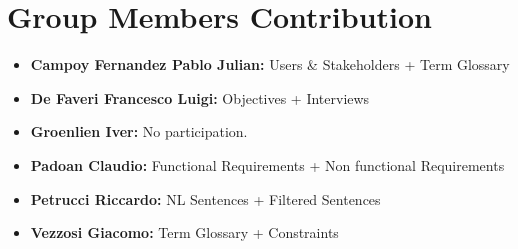 \documentclass{article}
\begin{document}
\maketitle











\section{Group Members Contribution}
\begin{itemize}
    \item \textbf{Campoy Fernandez Pablo Julian:} Users \& Stakeholders + Term Glossary
    \item \textbf{De Faveri Francesco Luigi:} Objectives + Interviews
    \item \textbf{Groenlien Iver:} No participation.
    \item \textbf{Padoan Claudio:} Functional Requirements + Non functional Requirements
    \item \textbf{Petrucci Riccardo:} NL Sentences + Filtered Sentences
    \item \textbf{Vezzosi Giacomo:} Term Glossary + Constraints
\end{itemize}
\end{document}
